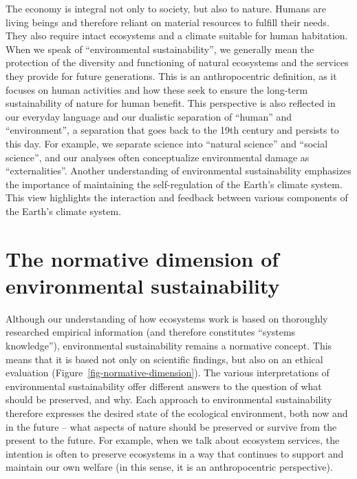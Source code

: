 \documentclass[
  a4paper,
  openany]{book}
\begin{document}
The economy is integral not only to society, but also to nature. Humans
are living beings and therefore reliant on material resources to fulfill
their needs. They also require intact ecosystems and a climate suitable
for human habitation. When we speak of ``environmental sustainability'',
we generally mean the protection of the diversity and functioning of
natural ecosystems and the services they provide for future generations.
This is an anthropocentric definition, as it focuses on human activities
and how these seek to ensure the long-term sustainability of nature for
human benefit. This perspective is also reflected in our everyday
language and our dualistic separation of ``human'' and ``environment'',
a separation that goes back to the 19th century and persists to this
day. For example, we separate science into ``natural science'' and
``social science'', and our analyses often conceptualize environmental
damage as ``externalities''. Another understanding of environmental
sustainability emphasizes the importance of maintaining the
self-regulation of the Earth's climate system. This view highlights the
interaction and feedback between various components of the Earth's
climate system.

\section{The normative dimension of environmental
sustainability}\label{the-normative-dimension-of-environmental-sustainability}

Although our understanding of how ecosystems work is based on thoroughly
researched empirical information (and therefore constitutes ``systems
knowledge''), environmental sustainability remains a normative concept.
This means that it is based not only on scientific findings, but also on
an ethical evaluation (Figure~\ref{fig-normative-dimension}). The
various interpretations of environmental sustainability offer different
answers to the question of what should be preserved, and why. Each
approach to environmental sustainability therefore expresses the desired
state of the ecological environment, both now and in the future -- what
aspects of nature should be preserved or survive from the present to the
future. For example, when we talk about ecosystem services, the
intention is often to preserve ecosystems in a way that continues to
support and maintain our own welfare (in this sense, it is an
anthropocentric perspective).
\end{document}
